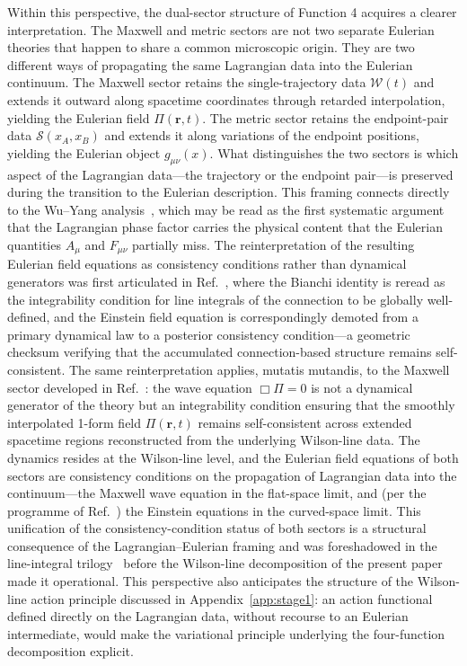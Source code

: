 \documentclass[%
 reprint, amsmath,amssymb, aps, prb, ]{revtex4-2}
\numberwithin{equation}{section}
\newcommand{\WL}{\mathcal{W}}
\begin{document}
Within this perspective, the dual-sector structure of Function 4 acquires a clearer interpretation. The Maxwell and metric sectors are not two separate Eulerian theories that happen to share a common microscopic origin. They are two different ways of propagating the same Lagrangian data into the Eulerian continuum. The Maxwell sector retains the single-trajectory data $\WL(t)$ and extends it outward along spacetime coordinates through retarded interpolation, yielding the Eulerian field $\Pi(\mathbf{r},t)$. The metric sector retains the endpoint-pair data $\mathcal{S}(x_A, x_B)$ and extends it along variations of the endpoint positions, yielding the Eulerian object $g_{\mu\nu}(x)$. What distinguishes the two sectors is which aspect of the Lagrangian data---the trajectory or the endpoint pair---is preserved during the transition to the Eulerian description. This framing connects directly to the Wu--Yang analysis~\cite{WuYang1975}, which may be read as the first systematic argument that the Lagrangian phase factor carries the physical content that the Eulerian quantities $A_\mu$ and $F_{\mu\nu}$ partially miss. The reinterpretation of the resulting Eulerian field equations as consistency conditions rather than dynamical generators was first articulated in Ref.~\cite{hanamura30}, where the Bianchi identity is reread as the integrability condition for line integrals of the connection to be globally well-defined, and the Einstein field equation is correspondingly demoted from a primary dynamical law to a posterior consistency condition---a geometric checksum verifying that the accumulated connection-based structure remains self-consistent. The same reinterpretation applies, mutatis mutandis, to the Maxwell sector developed in Ref.~\cite{hanamura54}: the wave equation $\Box \Pi = 0$ is not a dynamical generator of the theory but an integrability condition ensuring that the smoothly interpolated 1-form field $\Pi(\mathbf{r},t)$ remains self-consistent across extended spacetime regions reconstructed from the underlying Wilson-line data. The dynamics resides at the Wilson-line level, and the Eulerian field equations of both sectors are consistency conditions on the propagation of Lagrangian data into the continuum---the Maxwell wave equation in the flat-space limit, and (per the programme of Ref.~\cite{hanamura30}) the Einstein equations in the curved-space limit. This unification of the consistency-condition status of both sectors is a structural consequence of the Lagrangian--Eulerian framing and was foreshadowed in the line-integral trilogy~\cite{hanamura29, hanamura30, hanamura31} before the Wilson-line decomposition of the present paper made it operational. This perspective also anticipates the structure of the Wilson-line action principle discussed in Appendix~\ref{app:stage1}: an action functional defined directly on the Lagrangian data, without recourse to an Eulerian intermediate, would make the variational principle underlying the four-function decomposition explicit.
\end{document}
